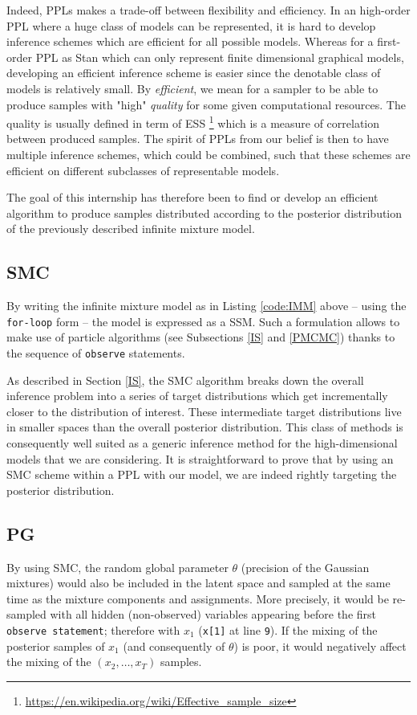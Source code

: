 Indeed, \glspl{PPL} makes a trade-off between flexibility and efficiency. In an high-order \gls{PPL} where a huge class of models can be represented, it is hard to develop inference schemes which are efficient for all possible models. Whereas for a first-order \gls{PPL} as Stan which can only represent finite dimensional graphical models, developing an efficient inference scheme is easier since the denotable class of models is relatively small.
By \textit{efficient}, we mean for a sampler to be able to produce samples with "high" \textit{quality} for some given computational resources. The quality is usually defined in term of \acrfull{ESS} \footnote{\url{https://en.wikipedia.org/wiki/Effective_sample_size}} which is a measure of correlation between produced samples.
The spirit of \glspl{PPL} from our belief is then to have multiple inference schemes, which could be combined, such that these schemes are efficient on different subclasses of representable models.

The goal of this internship has therefore been to find or develop an efficient algorithm to produce samples distributed according to the posterior distribution of the previously described infinite mixture model.

\subsection{\acrlong{SMC}}
By writing the infinite mixture model as in Listing \ref{code:IMM} above -- using the \texttt{for-loop} form -- the model is expressed as a \acrlong{SSM}. Such a formulation allows to make use of particle algorithms (see Subsections \ref{IS} and \ref{PMCMC}) thanks to the sequence of \texttt{observe} statements.

As described in Section \ref{IS}, the \acrfull{SMC} algorithm breaks down the overall inference problem into a series of target distributions which get incrementally closer to the distribution of interest. These intermediate target distributions live in smaller spaces than the overall posterior distribution. This class of methods is consequently well suited as a generic inference method for the high-dimensional models that we are considering. It is straightforward to prove that by using an \gls{SMC} scheme within a \gls{PPL} with our model, we are indeed rightly targeting the posterior distribution.

\subsection{\acrlong{PG}}
By using \gls{SMC}, the random global parameter $\theta$ (precision of the Gaussian mixtures) would also be included in the latent space and sampled at the same time as the mixture components and assignments. More precisely, it would be re-sampled with all hidden (non-observed) variables appearing before the first \texttt{observe statement}; therefore with $x_1$ (\texttt{x[1]} at line \texttt{9}).
If the mixing of the posterior samples of $x_1$ (and consequently of $\theta$) is poor, it would negatively affect the mixing of the $(x_2,\dots,x_T)$ samples.

